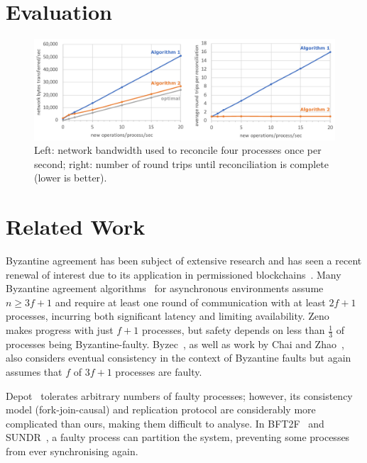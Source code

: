 \documentclass[a4paper,anonymous,USenglish]{lipics-v2019}
\begin{document}
\section{Evaluation}

\begin{figure}
  \includegraphics[width=\textwidth,keepaspectratio=true]{figs/evaluation.pdf}
  \caption{Left: network bandwidth used to reconcile four processes once per second; right: number of round trips until reconciliation is complete (lower is better).}
  \label{fig:evaluation}
\end{figure}


\section{Related Work}

Byzantine agreement has been subject of extensive research and has seen a recent renewal of interest due to its application in permissioned blockchains~\cite{Bano:2019}.
Many Byzantine agreement algorithms~\cite{Castro:1999,Kotla:2007,Bessani:2014,Aublin:2015,Cowling:2006,Abd:2005} for asynchronous environments assume $n \ge 3f+1$ and require at least one round of communication with at least $2f+1$ processes, incurring both significant latency and limiting availability.
Zeno~\cite{Singh:2009} makes progress with just $f+1$ processes, but safety depends on less than $\frac{1}{3}$ of processes being Byzantine-faulty.
Byzec~\cite{Shoker:2017}, as well as work by Chai and Zhao~\cite{Chai:2014}, also considers eventual consistency in the context of Byzantine faults but again assumes that $f$ of $3f+1$ processes are faulty.

Depot~\cite{Mahajan:2011} tolerates arbitrary numbers of faulty processes; however, its consistency model (fork-join-causal) and replication protocol are considerably more complicated than ours, making them difficult to analyse.
In BFT2F~\cite{Li:2007} and SUNDR~\cite{Mazieres:2002}, a faulty process can partition the system, preventing some processes from ever synchronising again.
\end{document}
